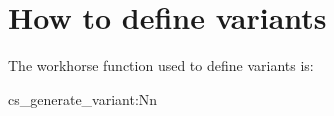 \section{How to define variants}

The workhorse function used to define variants is:

\begin{docCommand}{cs_generate_variant:Nn} {  }

\end{docCommand}




 